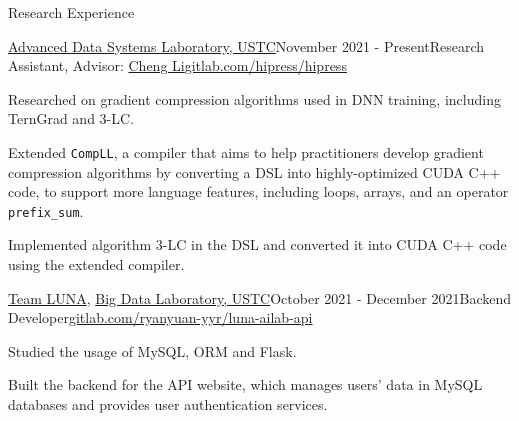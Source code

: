 \documentclass{resume} %
\begin{document}
\begin{rSection}{Research Experience}

    \begin{rSubsection}{\href{http://adsl.ustc.edu.cn/}{Advanced Data Systems Laboratory, USTC}}{November 2021 - Present}{Research Assistant, Advisor: \href{http://staff.ustc.edu.cn/~chengli7/}{Cheng Li}}{\href{https://gitlab.com/hipress/hipress}{gitlab.com/hipress/hipress}}

        \item Researched on gradient compression algorithms used in DNN training, including TernGrad and 3-LC.
        \item Extended \texttt{CompLL}, a compiler that aims to help practitioners develop gradient compression algorithms by converting a DSL into highly-optimized CUDA C++ code, to support more language features, including loops, arrays, and an operator \texttt{prefix\_sum}.
        \item Implemented algorithm 3-LC in the DSL and converted it into CUDA C++ code using the extended compiler.
    \end{rSubsection}


    \begin{rSubsection}{\href{https://luna.bdaa.pro/}{Team LUNA}, \href{http://bigdata.ustc.edu.cn/}{Big Data Laboratory, USTC}}{October 2021 - December 2021}{Backend Developer}{\href{https://gitlab.com/ryanyuan-yyr/luna-ailab-api}{gitlab.com/ryanyuan-yyr/luna-ailab-api}}
        \item Studied the usage of MySQL, ORM and Flask.
        \item Built the backend for the API website, which manages users' data in MySQL databases and provides user authentication services.
    \end{rSubsection}
\end{rSection}
\end{document}
